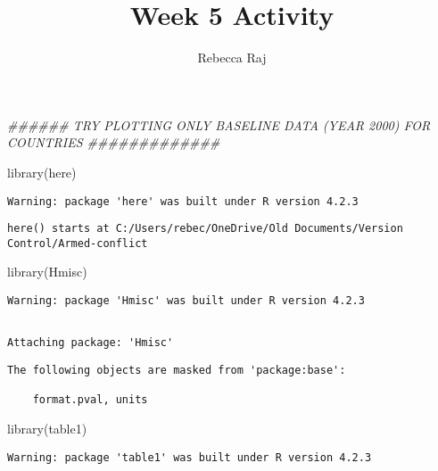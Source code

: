 \documentclass[
  letterpaper,
  DIV=11,
  numbers=noendperiod]{scrartcl}
\title{Week 5 Activity}
\author{Rebecca Raj}
\date{}
\newenvironment{Shaded}{\begin{snugshade}}{\end{snugshade}}
\newcommand{\DocumentationTok}[1]{\textcolor[rgb]{0.37,0.37,0.37}{\textit{#1}}}
\newcommand{\FunctionTok}[1]{\textcolor[rgb]{0.28,0.35,0.67}{#1}}
\newcommand{\NormalTok}[1]{\textcolor[rgb]{0.00,0.23,0.31}{#1}}
\begin{document}
\maketitle


\begin{Shaded}
\begin{Highlighting}[]
\DocumentationTok{\#\#\#\#\#\# TRY PLOTTING ONLY BASELINE DATA (YEAR 2000) FOR COUNTRIES \#\#\#\#\#\#\#\#\#\#\#\#\#}

\FunctionTok{library}\NormalTok{(here) }
\end{Highlighting}
\end{Shaded}

\begin{verbatim}
Warning: package 'here' was built under R version 4.2.3
\end{verbatim}

\begin{verbatim}
here() starts at C:/Users/rebec/OneDrive/Old Documents/Version Control/Armed-conflict
\end{verbatim}

\begin{Shaded}
\begin{Highlighting}[]
\FunctionTok{library}\NormalTok{(Hmisc) }
\end{Highlighting}
\end{Shaded}

\begin{verbatim}
Warning: package 'Hmisc' was built under R version 4.2.3
\end{verbatim}

\begin{verbatim}

Attaching package: 'Hmisc'
\end{verbatim}

\begin{verbatim}
The following objects are masked from 'package:base':

    format.pval, units
\end{verbatim}

\begin{Shaded}
\begin{Highlighting}[]
\FunctionTok{library}\NormalTok{(table1) }
\end{Highlighting}
\end{Shaded}

\begin{verbatim}
Warning: package 'table1' was built under R version 4.2.3
\end{verbatim}
\end{document}
